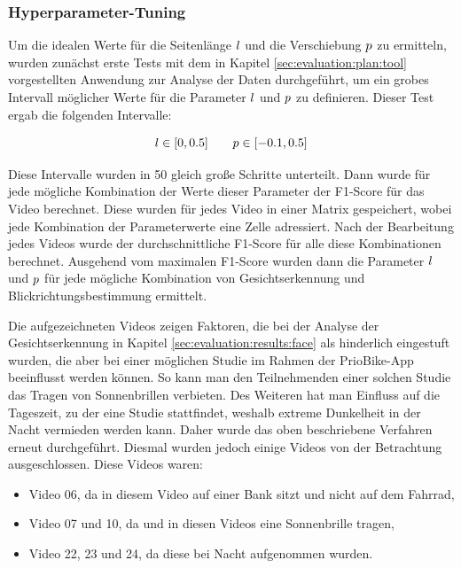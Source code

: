 \subsubsection{Hyperparameter-Tuning}\label{sec:evaluation:results:gaze:threshold}

Um die idealen Werte für die Seitenlänge $l$ und die Verschiebung $p$ zu ermitteln, wurden zunächst erste Tests mit dem in Kapitel \ref{sec:evaluation:plan:tool} vorgestellten Anwendung zur Analyse der Daten durchgeführt, um ein grobes Intervall möglicher Werte für die Parameter $l$ und $p$ zu definieren. Dieser Test ergab die folgenden Intervalle:

\[
l \in [0,0.5] \qquad p \in [-0.1, 0.5]
\]

Diese Intervalle wurden in 50 gleich große Schritte unterteilt. Dann wurde für jede mögliche Kombination der Werte dieser Parameter der F1-Score für das Video berechnet. Diese wurden für jedes Video in einer Matrix gespeichert, wobei jede Kombination der Parameterwerte eine Zelle adressiert. Nach der Bearbeitung jedes Videos wurde der durchschnittliche F1-Score für alle diese Kombinationen berechnet. Ausgehend vom maximalen F1-Score wurden dann die Parameter $l$ und $p$ für jede mögliche Kombination von Gesichtserkennung und Blickrichtungsbestimmung ermittelt. 

Die aufgezeichneten Videos zeigen Faktoren, die bei der Analyse der Gesichtserkennung in Kapitel \ref{sec:evaluation:results:face} als hinderlich eingestuft wurden, die aber bei einer möglichen Studie im Rahmen der PrioBike-App beeinflusst werden können. So kann man den Teilnehmenden einer solchen Studie das Tragen von Sonnenbrillen verbieten. Des Weiteren hat man Einfluss auf die Tageszeit, zu der eine Studie stattfindet, weshalb extreme Dunkelheit in der Nacht vermieden werden kann. Daher wurde das oben beschriebene Verfahren erneut durchgeführt. Diesmal wurden jedoch einige Videos von der Betrachtung ausgeschlossen. Diese Videos waren:

\begin{itemize}
    \item Video 06, da \markus in diesem Video auf einer Bank sitzt und nicht auf dem Fahrrad,
    \item Video 07 und 10, da \paul und \philipp in diesen Videos eine Sonnenbrille tragen,
    \item Video 22, 23 und 24, da diese bei Nacht aufgenommen wurden.
\end{itemize}

